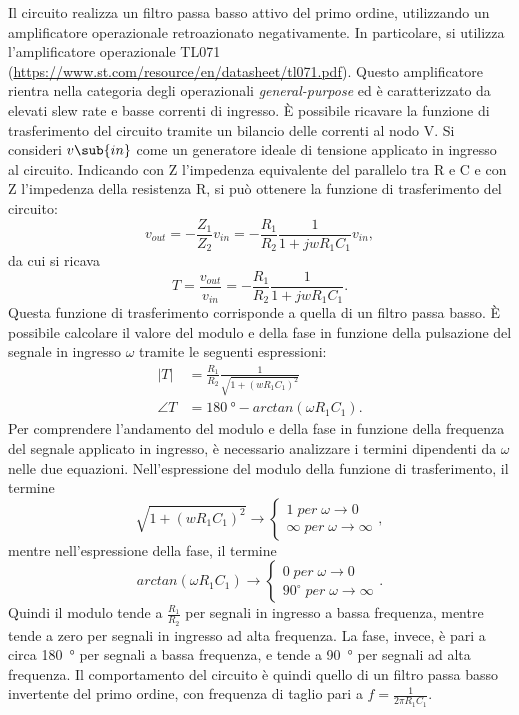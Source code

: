 \noindent
Il circuito realizza un filtro passa basso attivo del primo ordine, utilizzando un amplificatore operazionale retroazionato negativamente. In particolare, si utilizza l'amplificatore operazionale TL071 (\url{https://www.st.com/resource/en/datasheet/tl071.pdf}). Questo amplificatore rientra nella categoria degli operazionali \textit{general-purpose} ed è caratterizzato da elevati slew rate e basse correnti di ingresso.
\`E possibile ricavare la funzione di trasferimento del circuito tramite un bilancio delle correnti al nodo V\super{-}. Si consideri $v\sub{in}$ come un generatore ideale di tensione applicato in ingresso al circuito. Indicando con Z l'impedenza equivalente del parallelo tra R e C e con Z l'impedenza della resistenza R, si può ottenere la funzione di trasferimento del circuito:
\begin{equation}
	v_{out}=-\frac{Z_1}{Z_2}v_{in}=-\frac{R_1}{R_2}\frac{1}{1+j w R_1 C_1} v_{in},
\end{equation}
da cui si ricava
\begin{equation}
	T=\frac{v_{out}}{v_{in}}=-\frac{R_1}{R_2}\frac{1}{1+j w R_1 C_1}.
\end{equation}
Questa funzione di trasferimento corrisponde a quella di un filtro passa basso. È possibile calcolare il valore del modulo e della fase in funzione della pulsazione del segnale in ingresso $\omega$ tramite le seguenti espressioni:
\begin{equation}
	\begin{split}
		|T|&=\frac{R_1}{R_2}\frac{1}{\sqrt{1+(wR_1C_1)^2}} \\
		\angle T&=\SI{180}{\degree}-arctan(\omega R_1 C_1).
	\end{split}
	\label{eq:1.3}
\end{equation}
Per comprendere l'andamento del modulo e della fase in funzione della frequenza del segnale applicato in ingresso, è necessario analizzare i termini dipendenti da $\omega$ nelle due equazioni. Nell'espressione del modulo della funzione di trasferimento, il termine 
\begin{equation}
	\sqrt{1+(wR_1C_1)^2} \to
	\begin{cases}
		1 \; per \; \omega \to 0 \\
		\infty \; per \; \omega \to \infty
	\end{cases}
,
\end{equation}
mentre nell'espressione della fase, il termine
\begin{equation}
	arctan(\omega R_1 C_1) \to
	\begin{cases}
		0 \; per \; \omega \to 0 \\
		90^\circ \; per \; \omega \to \infty
	\end{cases}
	.
\end{equation}
Quindi il modulo tende a $\frac{R_1}{R_2}$ per segnali in ingresso a bassa frequenza, mentre tende a zero per segnali in ingresso ad alta frequenza. La fase, invece, è pari a circa \SI{180}{\degree} per segnali a bassa frequenza, e tende a \SI{90}{\degree} per segnali ad alta frequenza.
Il comportamento del circuito è quindi quello di un filtro passa basso invertente del primo ordine, con frequenza di taglio pari a $f=\frac{1}{2\pi R_1C_1}$.

